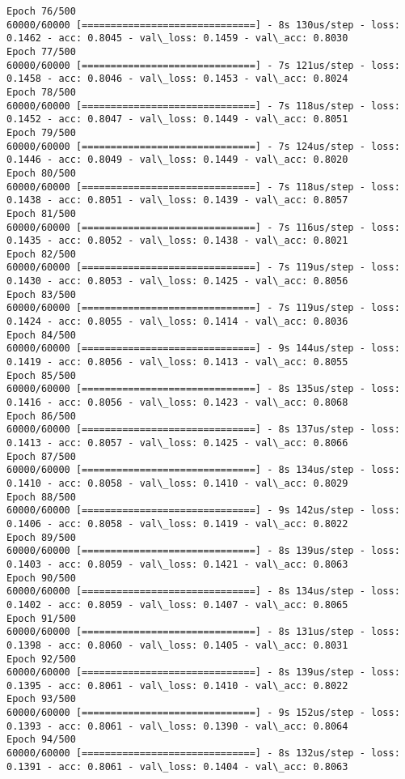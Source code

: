 \documentclass[11pt]{article}
\begin{document}
\begin{Verbatim}[commandchars=\\\{\}]
Epoch 76/500
60000/60000 [==============================] - 8s 130us/step - loss: 0.1462 - acc: 0.8045 - val\_loss: 0.1459 - val\_acc: 0.8030
Epoch 77/500
60000/60000 [==============================] - 7s 121us/step - loss: 0.1458 - acc: 0.8046 - val\_loss: 0.1453 - val\_acc: 0.8024
Epoch 78/500
60000/60000 [==============================] - 7s 118us/step - loss: 0.1452 - acc: 0.8047 - val\_loss: 0.1449 - val\_acc: 0.8051
Epoch 79/500
60000/60000 [==============================] - 7s 124us/step - loss: 0.1446 - acc: 0.8049 - val\_loss: 0.1449 - val\_acc: 0.8020
Epoch 80/500
60000/60000 [==============================] - 7s 118us/step - loss: 0.1438 - acc: 0.8051 - val\_loss: 0.1439 - val\_acc: 0.8057
Epoch 81/500
60000/60000 [==============================] - 7s 116us/step - loss: 0.1435 - acc: 0.8052 - val\_loss: 0.1438 - val\_acc: 0.8021
Epoch 82/500
60000/60000 [==============================] - 7s 119us/step - loss: 0.1430 - acc: 0.8053 - val\_loss: 0.1425 - val\_acc: 0.8056
Epoch 83/500
60000/60000 [==============================] - 7s 119us/step - loss: 0.1424 - acc: 0.8055 - val\_loss: 0.1414 - val\_acc: 0.8036
Epoch 84/500
60000/60000 [==============================] - 9s 144us/step - loss: 0.1419 - acc: 0.8056 - val\_loss: 0.1413 - val\_acc: 0.8055
Epoch 85/500
60000/60000 [==============================] - 8s 135us/step - loss: 0.1416 - acc: 0.8056 - val\_loss: 0.1423 - val\_acc: 0.8068
Epoch 86/500
60000/60000 [==============================] - 8s 137us/step - loss: 0.1413 - acc: 0.8057 - val\_loss: 0.1425 - val\_acc: 0.8066
Epoch 87/500
60000/60000 [==============================] - 8s 134us/step - loss: 0.1410 - acc: 0.8058 - val\_loss: 0.1410 - val\_acc: 0.8029
Epoch 88/500
60000/60000 [==============================] - 9s 142us/step - loss: 0.1406 - acc: 0.8058 - val\_loss: 0.1419 - val\_acc: 0.8022
Epoch 89/500
60000/60000 [==============================] - 8s 139us/step - loss: 0.1403 - acc: 0.8059 - val\_loss: 0.1421 - val\_acc: 0.8063
Epoch 90/500
60000/60000 [==============================] - 8s 134us/step - loss: 0.1402 - acc: 0.8059 - val\_loss: 0.1407 - val\_acc: 0.8065
Epoch 91/500
60000/60000 [==============================] - 8s 131us/step - loss: 0.1398 - acc: 0.8060 - val\_loss: 0.1405 - val\_acc: 0.8031
Epoch 92/500
60000/60000 [==============================] - 8s 139us/step - loss: 0.1395 - acc: 0.8061 - val\_loss: 0.1410 - val\_acc: 0.8022
Epoch 93/500
60000/60000 [==============================] - 9s 152us/step - loss: 0.1393 - acc: 0.8061 - val\_loss: 0.1390 - val\_acc: 0.8064
Epoch 94/500
60000/60000 [==============================] - 8s 132us/step - loss: 0.1391 - acc: 0.8061 - val\_loss: 0.1404 - val\_acc: 0.8063

\end{Verbatim}
\end{document}
